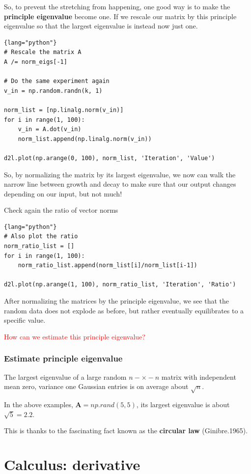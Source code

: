 So, to prevent the stretching from happening, one good way is to make the {\bf principle eigenvalue} become one.
If we rescale our matrix by this principle eigenvalue so that the largest
eigenvalue is instead now just one.

\begin{lstlisting}{lang="python"}
# Rescale the matrix A
A /= norm_eigs[-1]

# Do the same experiment again
v_in = np.random.randn(k, 1)

norm_list = [np.linalg.norm(v_in)]
for i in range(1, 100):
    v_in = A.dot(v_in)
    norm_list.append(np.linalg.norm(v_in))

d2l.plot(np.arange(0, 100), norm_list, 'Iteration', 'Value')
\end{lstlisting}

So, by normalizing the matrix by its largest eigenvalue, we now can walk the
narrow line between growth and decay to make sure that our output changes
depending on our input, but not much!

Check again the ratio of vector norms
\begin{lstlisting}{lang="python"}
# Also plot the ratio
norm_ratio_list = []
for i in range(1, 100):
    norm_ratio_list.append(norm_list[i]/norm_list[i-1])

d2l.plot(np.arange(1, 100), norm_ratio_list, 'Iteration', 'Ratio')
\end{lstlisting}


After normalizing the matrices by the principle eigenvalue, we see that the
random data does not explode as before, but rather eventually equilibrates to a
specific value.

\textcolor{red}{How can we estimate this principle eigenvalue?}


\subsection{Estimate principle eigenvalue}

The largest eigenvalue of a large random $n-\times-n$ matrix with independent mean zero,
variance one Gaussian entries is on average about $\sqrt{n}$.

In the above examples, $\mathbf{A} = np.rand(5, 5)$, its largest eigenvalue is
about $\sqrt{5} = 2.2$.

This is thanks to the fascinating fact known as the {\bf circular law}
(Ginibre.1965).


\chapter{Calculus: derivative}


